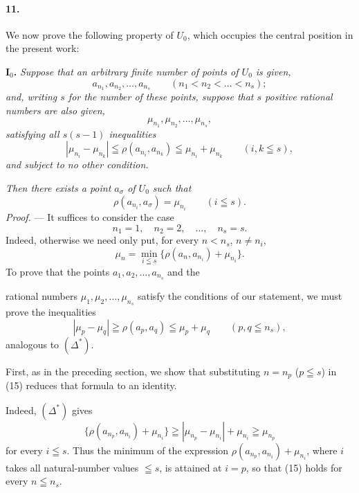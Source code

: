 \documentclass[a4paper,12pt]{amsart}
\newcommand{\srcpage}[1]{} %
\begin{document}
\paragraph{11.}
We now prove the following property of $U_0$, which occupies the central position in the present work:

\textbf{I$_0$.} \textit{Suppose that an arbitrary finite number of points of $U_0$ is given,}
\[
a_{n_1},a_{n_2},\dots,a_{n_s}\qquad(n_1<n_2<\dots<n_s);
\]
\textit{and, writing $s$ for the number of these points, suppose that $s$ positive rational numbers are also given,}
\[
\mu_{n_1},\mu_{n_2},\dots,\mu_{n_s},
\]
\textit{satisfying all $s(s-1)$ inequalities}
\begin{equation}\tag{$\Delta^*$}
|\mu_{n_i}-\mu_{n_k}|\leqq\rho(a_{n_i},a_{n_k})\leqq\mu_{n_i}+\mu_{n_k}
\qquad(i,k\leqq s),
\end{equation}
\textit{and subject to no other condition.}

\textit{Then there exists a point $a_\sigma$ of $U_0$ such that}
\[
\rho(a_{n_i},a_\sigma)=\mu_{n_i}\qquad(i\leqq s).
\]
\textit{Proof.} --- It suffices to consider the case
\begin{equation}\tag{14}
n_1=1,\quad n_2=2,\quad\dots,\quad n_s=s.
\end{equation}
Indeed, otherwise we need only put, for every $n<n_s$, $n\ne n_i$,
\begin{equation}\tag{15}
\mu_n=\min_{i\leqq s}\{\rho(a_n,a_{n_i})+\mu_{n_i}\}.
\end{equation}
To prove that the points $a_1,a_2,\dots,a_{n_s}$ and the
\srcpage{57}
rational numbers $\mu_1,\mu_2,\dots,\mu_{n_s}$ satisfy the conditions of our statement, we must prove the inequalities
\begin{equation}\tag{$\Delta^*$ bis}
|\mu_p-\mu_q|\geqq\rho(a_p,a_q)\leqq\mu_p+\mu_q\qquad(p,q\leqq n_s),
\end{equation}
analogous to $(\Delta^*)$.

First, as in the preceding section, we show that substituting $n=n_p$ ($p\leqq s$) in (15) reduces that formula to an identity.

Indeed, $(\Delta^*)$ gives
\[
\{\rho(a_{n_p},a_{n_i})+\mu_{n_i}\}\geqq|\mu_{n_p}-\mu_{n_i}|+\mu_{n_i}\geqq\mu_{n_p}
\]
for every $i\leqq s$. Thus the minimum of the expression $\rho(a_{n_p},a_{n_i})+\mu_{n_i}$, where $i$ takes all natural-number values $\leqq s$, is attained at $i=p$, so that (15) holds for every $n\leqq n_s$.
\end{document}
